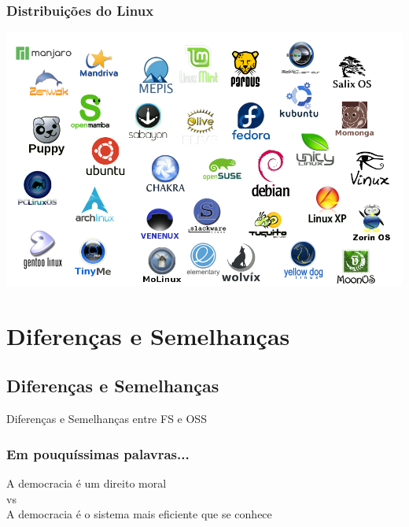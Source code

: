 \documentclass[xcolor=dvipsnames]{beamer}
\begin{document}
\begin{frame}
	\frametitle{Distribuições do Linux}
	\includegraphics[scale=0.5]{distros.png}

	\end{frame}



\section{Diferenças e Semelhanças}	
\subsection{Diferenças e Semelhanças}	

\begin{frame}
\vspace{0.2cm}
\begin{center}
\Huge{Diferenças e Semelhanças entre FS e OSS}
\end{center}

\end{frame}


\begin{frame}
	\frametitle{Em pouquíssimas palavras...}
	
\begin{center}
\huge{A democracia é um direito moral} \\[0.2cm]
\large{vs}\\[0.2cm]
\huge{A democracia é o sistema mais eficiente que se conhece}
\end{center}

\end{frame}
\end{document}
